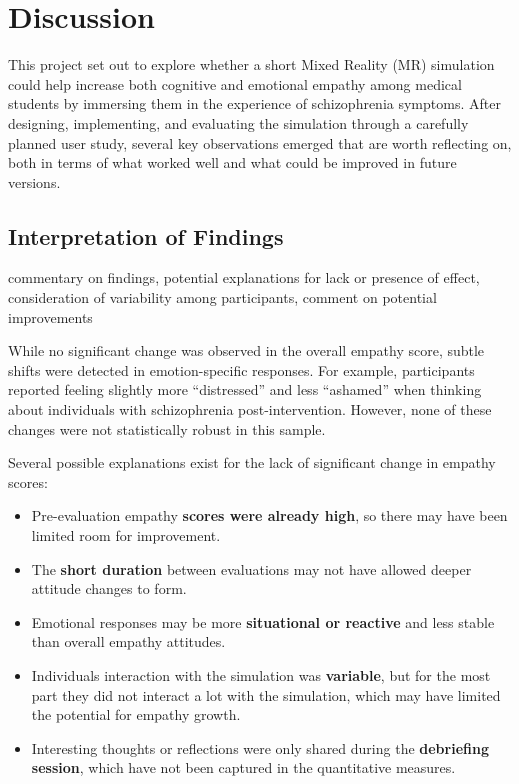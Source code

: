 \chapter{Discussion}
\label{ch:discussion}

This project set out to explore whether a short Mixed Reality (MR) simulation could help increase both cognitive and emotional empathy among medical students by immersing them in the experience of schizophrenia symptoms. After designing, implementing, and evaluating the simulation through a carefully planned user study, several key observations emerged that are worth reflecting on, both in terms of what worked well and what could be improved in future versions.

\section{Interpretation of Findings}

commentary on findings, potential explanations for lack or presence of effect, consideration of variability among participants, comment on potential improvements


While no significant change was observed in the overall empathy score, subtle shifts were detected in emotion-specific responses. For example, participants reported feeling slightly more “distressed” and less “ashamed” when thinking about individuals with schizophrenia post-intervention. However, none of these changes were not statistically robust in this sample.

Several possible explanations exist for the lack of significant change in empathy scores:
\begin{itemize}
  \item Pre-evaluation empathy \textbf{scores were already high}, so there may have been limited room for improvement.
  \item The \textbf{short duration} between evaluations may not have allowed deeper attitude changes to form.
  \item Emotional responses may be more \textbf{situational or reactive} and less stable than overall empathy attitudes.
  \item Individuals interaction with the simulation was \textbf{variable}, but for the most part they did not interact a lot with the simulation, which may have limited the potential for empathy growth.
  \item Interesting thoughts or reflections were only shared during the \textbf{debriefing session}, which have not been captured in the quantitative measures.
\end{itemize}

